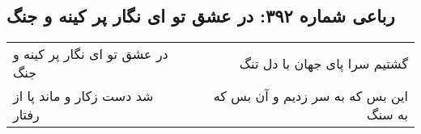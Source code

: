 \begin{center}
\section*{رباعی شماره ۳۹۲: در عشق تو ای نگار پر کینه و جنگ}
\label{sec:sh392}
\begin{longtable}{l p{0.5cm} r}
در عشق تو ای نگار پر کینه و جنگ
&&
گشتیم سرا پای جهان با دل تنگ
\\
شد دست زکار و ماند پا از رفتار
&&
این بس که به سر زدیم و آن بس که به سنگ
\\
\end{longtable}
\end{center}
